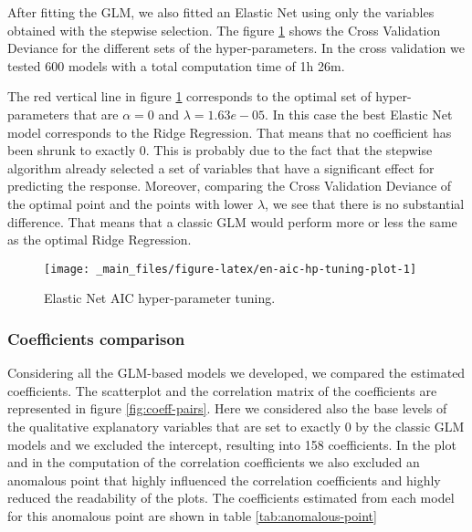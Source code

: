 \documentclass[a4paper, twoside, openright, 12pt]{report}
\theoremstyle{definition}
\theoremstyle{definition}
\theoremstyle{definition}
\theoremstyle{remark}
\begin{document}
After fitting the GLM, we also fitted an Elastic Net using only the variables obtained with the stepwise selection. The figure \ref{fig:en-aic-hp-tuning-plot} shows the Cross Validation Deviance for the different sets of the hyper-parameters. In the cross validation we tested 600 models with a total computation time of 1h 26m.

The red vertical line in figure \ref{fig:en-aic-hp-tuning-plot} corresponds to the optimal set of hyper-parameters that are \(\alpha = 0\) and
\(\lambda = 1.63e-05\). In this case the best Elastic Net model corresponds to the Ridge Regression. That means that no coefficient has been shrunk to exactly 0. This is probably due to the fact that the stepwise algorithm already selected a set of variables that have a significant effect for predicting the response. Moreover, comparing the Cross Validation Deviance of the optimal point and the points with lower \(\lambda\), we see that there is no substantial difference. That means that a classic GLM would perform more or less the same as the optimal Ridge Regression.





\begin{figure}[!hbtp]

{\centering \texttt{[image: \_main\_files/figure-latex/en-aic-hp-tuning-plot-1]} 

}

\caption[Elastic Net AIC hyper-parameter tuning.]{Elastic Net AIC hyper-parameter tuning.}\label{fig:en-aic-hp-tuning-plot}
\end{figure}

\hypertarget{coefficients-comparison}{%
\subsubsection{Coefficients comparison}\label{coefficients-comparison}}

Considering all the GLM-based models we developed, we compared the estimated coefficients. The scatterplot and the correlation matrix of the coefficients are represented in figure \ref{fig:coeff-pairs}. Here we considered also the base levels of the qualitative explanatory variables that are set to exactly 0 by the classic GLM models and we excluded the intercept, resulting into 158 coefficients. In the plot and in the computation of the correlation coefficients we also excluded an anomalous point that highly influenced the correlation coefficients and highly reduced the readability of the plots. The coefficients estimated from each model for this anomalous point are shown in table \ref{tab:anomalous-point}
\end{document}
